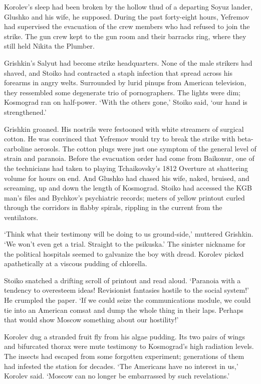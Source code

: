 Korolev's sleep had been broken by the hollow thud of a departing Soyuz lander, Glushko and his wife, he supposed. During the past forty-eight hours, Yefremov had supervised the evacuation of the crew members who had refused to join the strike. The gun crew kept to the gun room and their barracks ring, where they still held Nikita the Plumber.

Grishkin's Salyut had become strike headquarters. None of the male strikers had shaved, and Stoiko had contracted a staph infection that spread across his forearms in angry welts. Surrounded by lurid pinups from American television, they ressembled some degenerate trio of pornographers. The lights were dim; Kosmograd ran on half-power. `With the others gone,' Stoiko said, `our hand is strengthened.'

Grishkin groaned. His nostrils were festooned with white streamers of surgical cotton. He was convinced that Yefremov would try to break the strike with beta-carboline aerosols. The cotton plugs were just one symptom of the general level of strain and paranoia. Before the evacuation order had come from Baikonur, one of the technicians had taken to playing Tchaikovsky's 1812 Overture at shattering volume for hours on end. And Glushko had chased his wife, naked, bruised, and screaming, up and down the length of Kosmograd. Stoiko had accessed the KGB man's files and Bychkov's psychiatric records; meters of yellow printout curled through the corridors in flabby spirals, rippling in the current from the ventilators.

`Think what their testimony will be doing to us ground-side,' muttered Grishkin. `We won't even get a trial. Straight to the psikuska.' The sinister nickname for the political hospitals seemed to galvanize the boy with dread. Korolev picked apathetically at a viscous pudding of chlorella.

Stoiko snatched a drifting scroll of printout and read aloud. `Paranoia with a tendency to overesteem ideas! Revisionist fantasies hostile to the social system!' He crumpled the paper. `If we could seize the communications module, we could tie into an American comsat and dump the whole thing in their laps. Perhaps that would show Moscow something about our hostility!'

Korolev dug a stranded fruit fly from his algae pudding. Its two pairs of wings and bifurcated thorax were mute testimony to Kosmograd's high radiation levels. The insects had escaped from some forgotten experiment; generations of them had infested the station for decades. `The Americans have no interest in us,' Korolev said. `Moscow can no longer be embarrassed by such revelations.'

